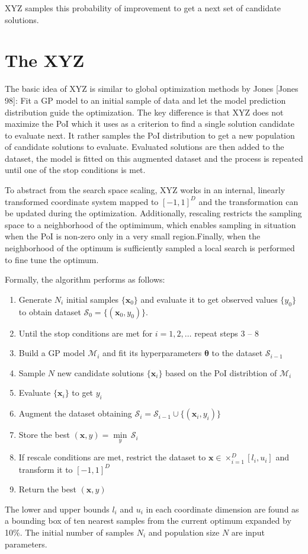 \documentclass{sig-alternate}
\newcommand{\xx}{\mathrm{\mathbf{x}}}
\newcommand{\ttheta}{\mathbf{\theta}}
\begin{document}
XYZ samples this probability of improvement to get a next set of candidate solutions.

\section{The XYZ}

The basic idea of XYZ is similar to global optimization methods by Jones [Jones 98]: Fit a 
GP model to an initial sample of data and let the model prediction distribution guide the optimization. 
The key difference is that XYZ does not maximize the PoI which it uses as a criterion to find a single
solution candidate to evaluate next. It rather samples the PoI distribution to get a new population of
candidate solutions to evaluate. Evaluated solutions are then added to the dataset, the model
is fitted on this augmented dataset and the process is repeated until one of the stop conditions is met.

To abstract from the search space scaling, XYZ works in an internal, linearly transformed coordinate system 
mapped to $[-1, 1]^D$ and the transformation can be updated during the optimization. Additionally, rescaling 
restricts the sampling space to a neighborhood of the optimimum, which enables sampling in situation when 
the PoI is non-zero only in a very small region.Finally, when the neighborhood of the optimum is sufficiently
sampled a local search is performed to fine tune the optimum. 

Formally, the algorithm performs as follows:
\begin{enumerate}
  \item Generate $N_i$ initial samples $\{\xx_0\}$ and evaluate it to get observed values $\{y_0\}$ to obtain
    dataset $\mathcal{S}_0 = \{(\xx_0, y_0)\}$.
  \item Until the stop conditions are met for $i = 1, 2, \dots$ repeat steps 3 -- 8
  \item Build a GP model $\mathcal{M}_i$ and fit its hyperparameters $\ttheta$ to the dataset $\mathcal{S}_{i-1}$
  \item Sample $N$ new candidate solutions $\{\xx_i\}$ based on the PoI distribtion of $\mathcal{M}_i$
  \item Evaluate $\{\xx_i\}$ to get ${y_i}$ 
  \item Augment the dataset obtaining $\mathcal{S}_i = \mathcal{S}_{i-1} \cup \{(\xx_i, y_i)\}$
  \item Store the best $(\xx, y) = \underset{y}{\min} \, \mathcal{S}_i$
  \item If rescale conditions are met, restrict the dataset to $\xx \in \times_{i=1}^D [l_i, u_i]$ and
    transform it to $[-1, 1]^D$
  \item Return the best $(\xx, y)$
\end{enumerate}
The lower and upper bounds $l_i$ and $u_i$ in each coordinate dimension are found as a bounding box
of ten nearest samples from the current optimum expanded by 10\%. The initial number of samples $N_i$ and
population size $N$ are input parameters.
\end{document}
